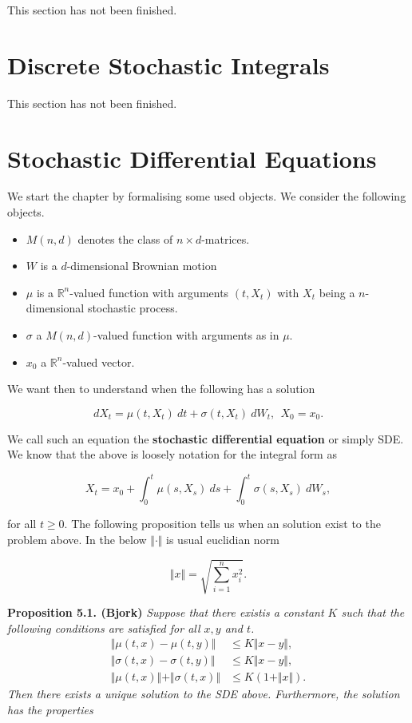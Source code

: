 \documentclass[a4paper,10pt,openany]{book}
\providecommand{\tightlist}{%
 \setlength{\itemsep}{0pt}\setlength{\parskip}{0pt}}
\begin{document}
This section has not been finished.

\hypertarget{discrete-stochastic-integrals}{%
\section{Discrete Stochastic Integrals}\label{discrete-stochastic-integrals}}

This section has not been finished.

\hypertarget{stochastic-differential-equations}{%
\section{Stochastic Differential Equations}\label{stochastic-differential-equations}}

We start the chapter by formalising some used objects. We consider the following objects.

\begin{itemize}
\tightlist
\item
  \(M(n,d)\) denotes the class of \(n\times d\)-matrices.
\item
  \(W\) is a \(d\)-dimensional Brownian motion
\item
  \(\mu\) is a \(\mathbb{R}^n\)-valued function with arguments \((t,X_t)\) with \(X_t\) being a \(n\)-dimensional stochastic process.
\item
  \(\sigma\) a \(M(n,d)\)-valued function with arguments as in \(\mu\).
\item
  \(x_0\) a \(\mathbb{R}^n\)-valued vector.
\end{itemize}

We want then to understand when the following has a solution

\[
dX_t=\mu(t,X_t)\ dt + \sigma(t,X_t)\ dW_t,\ \ X_0=x_0.\tag{5.1/2}
\]

We call such an equation the \textbf{stochastic differential equation} or simply SDE. We know that the above is loosely notation for the integral form as

\[
X_t=x_0+\int_0^t\mu(s,X_s)\ ds +\int_0^t\sigma(s,X_s)\ dW_s,\tag{5.3}
\]

for all \(t\ge 0\). The following proposition tells us when an solution exist to the problem above. In the below \(\Vert \cdot \Vert\) is usual euclidian norm

\[
\Vert x\Vert=\sqrt{\sum_{i=1}^nx_i^2}.
\]

\textbf{Proposition 5.1. (Bjork)} \emph{Suppose that there existis a constant \(K\) such that the following conditions are satisfied for all \(x,y\) and \(t\).}
\begin{align*}
\Vert \mu(t,x) - \mu(t,y) \Vert &\le K\Vert x-y\Vert,\tag{5.6}\\
\Vert \sigma(t,x) - \sigma(t,y) \Vert &\le K\Vert x-y\Vert,\tag{5.7}\\
\Vert \mu(t,x) \Vert +\Vert \sigma(t,x) \Vert&\le K(1+\Vert x\Vert).\tag{5.8}
\end{align*}
\emph{Then there exists a unique solution to the SDE above. Furthermore, the solution has the properties}
\end{document}
